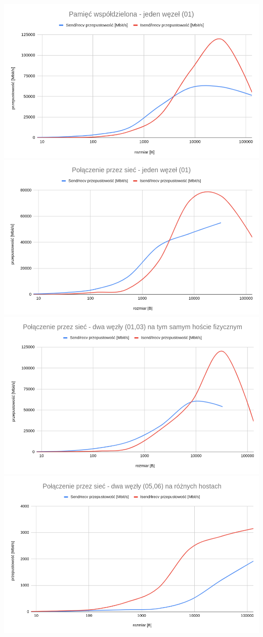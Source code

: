 \documentclass[10pt,english, openany]{book}
\begin{document}
\centering \includegraphics[scale=0.65]{pics/z1.png}    
\centering \includegraphics[scale=0.63]{pics/z2.png}    
\centering \includegraphics[scale=0.63]{pics/z3.png}    
\centering \includegraphics[scale=0.6]{pics/z4.png}    
\end{document}
